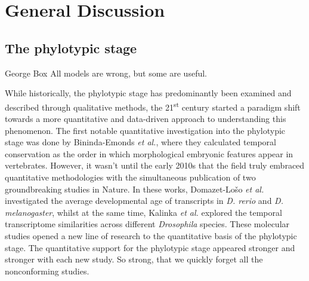 \chapter{General Discussion}\thumbforchapter
\newpage

\section{The phylotypic stage}

\begin{shadequote}[c]{George Box}
All models are wrong, but some are useful.
\end{shadequote}

While historically, the phylotypic stage has predominantly been examined and described through qualitative methods, the 21\textsuperscript{st} century started a paradigm shift towards a more quantitative and data-driven approach to understanding this phenomenon\cite{Chan2021}. The first notable quantitative investigation into the phylotypic stage was done by Bininda-Emonds \textit{et al.}, where they calculated temporal conservation as the order in which morphological embryonic features appear in vertebrates. However, it wasn't until the early 2010s that the field truly embraced quantitative methodologies with the simultaneous publication of two groundbreaking studies in Nature\cite{Kalinka2010, DomazetLoso2010}. In these works, Domazet-Lošo \textit{et al.} investigated the average developmental age of transcripts in \textit{D. rerio} and \textit{D. melanogaster}, whilst at the same time, Kalinka \textit{et al.} explored the temporal transcriptome similarities across different \textit{Drosophila} species. These molecular studies opened a new line of research to the quantitative basis of the phylotypic stage. The quantitative support for the phylotypic stage appeared stronger and stronger with each new study. So strong, that we quickly forget all the nonconforming studies.

